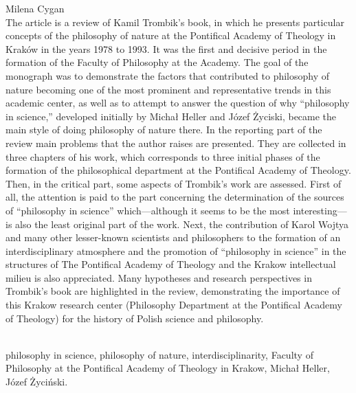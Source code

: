 \begin{newrevplenv}{Milena Cygan}
{}\\
{The article is a review of Kamil Trombik's book, in which he presents particular concepts of the philosophy of nature at the Pontifical Academy of Theology in Kraków in the years 1978 to 1993. It was the first and decisive period in the formation of the Faculty of Philosophy at the Academy.
The goal of the monograph was to demonstrate the factors that contributed to philosophy of nature becoming one of the most prominent and representative trends in this academic center, as well as to attempt to answer the question of why ``philosophy in science,'' developed initially by Michał Heller and Józef Życiski, became the main style of doing philosophy of nature there.
In the reporting part of the review main problems that the author raises are presented. They are collected in three chapters of his work, which corresponds to three initial phases of the formation of the philosophical department
at the Pontifical Academy of Theology.
Then, in the critical part, some aspects of Trombik's work are assessed. First of all, the attention is paid to the part concerning the determination of the sources of ``philosophy in science'' which---although it seems to be the most interesting---is also the least original part of the work.
Next, the contribution of Karol Wojtya and many other lesser-known scientists and philosophers to the formation of an interdisciplinary atmosphere and the promotion of ``philosophy in science'' in the structures of The Pontifical Academy of Theology and the Krakow intellectual milieu is also appreciated.
Many hypotheses and research perspectives in Trombik's book are highlighted in the review, demonstrating the importance of this Krakow research center (Philosophy Department at the Pontifical Academy of Theology) for the history of Polish science and philosophy.
}\par%
\vspace{2mm}%
{}\\%
{philosophy in science, philosophy of nature, interdisciplinarity, Faculty of Philosophy at the Pontifical Academy of Theology in Krakow, Michał Heller, Józef Życiński.}%


\end{newrevplenv}
